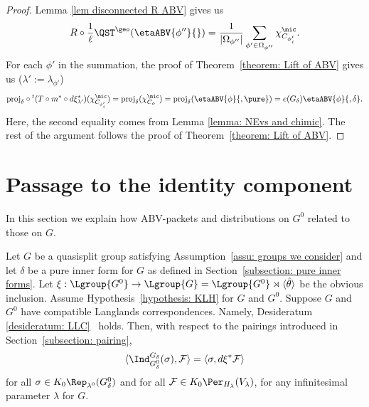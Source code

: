 \documentclass[11pt,letterpaper]{amsart}
\numberwithin{equation}{section}
\begin{document}
\begin{proof}
Lemma \ref{lem disconnected R ABV} gives us
\[ R \circ \frac{1}{\ell} \QST^{\geo}(\etaABV{\phi''}{})= \frac{1}{|\Omega_{\phi''}|}\sum_{\phi' \in \Omega_{\phi''}} \chi^{\mic}_{C_{\phi_i'}}.\]
For each $\phi'$ in the summation, the proof of Theorem~\ref{theorem: Lift of ABV} gives us ($\lambda':=\lambda_{\phi'}$)
\[ \mathrm{proj}_{\delta} \circ {}^t(T \circ m^{\ast} \circ d \xi_{\lambda'}^{\ast}) (\chi^{\mic}_{C_{\phi_i'}})= \mathrm{proj}_{\delta}(\chi_{C_{\phi}}^{\mic})= \mathrm{proj}_{\delta} (\etaABV{\phi}{,\pure})=e(G_{\delta})\etaABV{\phi}{,\delta}. \]
Here, the second equality comes from Lemma \ref{lemma: NEvs and chimic}. 
The rest of the argument follows the proof of Theorem~\ref{theorem: Lift of ABV}.
\end{proof}


\section{Passage to the identity component}\label{section: passage to the identity}


In this section we explain how ABV-packets and distributions on $G^0$ related to those on $G$. 




\begin{proposition}\label{proposition: induction from identity}
    Let $G$ be a quasisplit group satisfying Assumption~\ref{assu: groups we consider} and let $\delta$ be a pure inner form for $G$ as defined in Section~\ref{subsection: pure inner forms}. 
    Let $\xi : \Lgroup{G^0} \to \Lgroup{G} = \Lgroup{G^0} \rtimes {\langle{\hat\theta}\rangle}$ be the obvious inclusion.
    Assume Hypothesis~\ref{hypothesis: KLH} for $G$ and $G^0$.
    Suppose $G$ and $G^0$ have compatible Langlands  correspondences. Namely, Desideratum \ref{desideratum: LLC} \RES \ holds. 
    Then, with respect to the pairings introduced in Section~\ref{subsection: pairing},
\[
    \langle \Ind_{G_\delta^0}^{G_\delta}(\sigma), \mathcal{F} \rangle
    =
    \langle \sigma , d\xi^* \mathcal{F}\rangle
\]
for all $\sigma \in K_0\Rep_{\lambda^0}(G^0_\delta)$ and for all $\mathcal{F}\in K_0 \Per_{H_{\lambda}}(V_{\lambda})$, for any infinitesimal parameter $\lambda$ for $G$.
\end{proposition}
\end{document}
